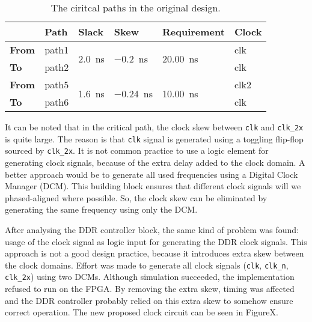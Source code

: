 \documentclass[final]{article}
\begin{document}
\begin{table}
\centering
\begin{tabular}{llllll}
\caption{The ciritcal paths in the original design.}
\label{tab:crit-path-orig}
\toprule
     & \textbf{Path}  & \textbf{Slack}                     & \textbf{Skew}                       & \textbf{Requirement}                & \textbf{Clock} \\ 
\midrule
\textbf{From} & path1 & \multirow{2}{*}{\SI{2.0}{\nano\second}} & \multirow{2}{*}{\SI{-0.2}{\nano\second}}  & \multirow{2}{*}{\SI{20.00}{\nano\second}} & clk   \\
\textbf{To}   & path2 &                           &                             &                            & clk   \\ 
\midrule
\textbf{From} & path5 & \multirow{2}{*}{\SI{1.6}{\nano\second}} & \multirow{2}{*}{\SI{-0.24}{\nano\second}} & \multirow{2}{*}{\SI{10.00}{\nano\second}} & clk2  \\
\textbf{To}   & path6 &                           &                             &                            & clk   \\ 
\bottomrule
\end{tabular}
\end{table}

It can be noted that in the critical path, the clock skew between \texttt{clk} and \texttt{clk\_2x} is quite large.
The reason is that \texttt{clk} signal is generated using a toggling flip-flop sourced by \texttt{clk\_2x}.
It is not common practice to use a logic element for generating clock signals, because of the extra delay added to the clock domain.
A better approach would be to generate all used frequencies using a Digital Clock Manager (DCM).
This building block ensures that different clock signals will we phased-aligned where possible.
So, the clock skew can be eliminated by generating the same frequency using only the DCM.

After analysing the DDR controller block, the same kind of problem was found: usage of the clock signal as logic input for generating the DDR clock signals.
This approach is not a good design practice, because it introduces extra skew between the clock domains.
Effort was made to generate all clock signals (\texttt{clk}, \texttt{clk\_n}, \texttt{clk\_2x}) using two DCMs.
Although simulation succeeded, the implementation refused to run on the FPGA.
By removing the extra skew, timing was affected and the DDR controller probably relied on this extra skew to somehow ensure correct operation.
The new proposed clock circuit can be seen in FigureX.
\end{document}
